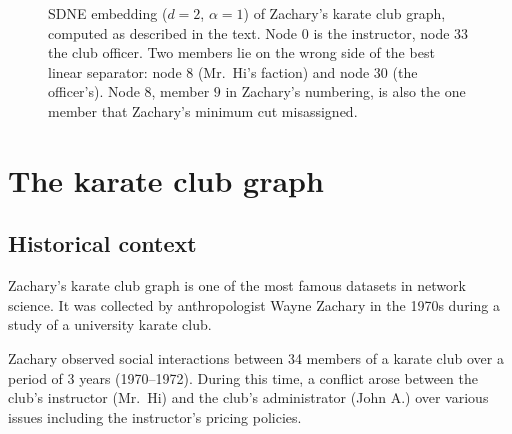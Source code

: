 \begin{notechapter}
\begin{figure}[ht]
\centering
{}
\caption{SDNE embedding ($d = 2$, $\alpha = 1$) of Zachary's karate club graph, computed as described in the text. Node $0$ is the instructor, node $33$ the club officer. Two members lie on the wrong side of the best linear separator: node $8$ (Mr.\ Hi's faction) and node $30$ (the officer's). Node $8$, member $9$ in Zachary's numbering, is also the one member that Zachary's minimum cut misassigned.}
\label{graph-autoencoders:fig:karate}
\end{figure}

\section{The karate club graph}
\label{graph-autoencoders:sec:karate_club}

\subsection{Historical context}

Zachary's karate club graph is one of the most famous datasets in network science. It was collected by anthropologist Wayne Zachary in the 1970s during a study of a university karate club.

\begin{remark}
Zachary observed social interactions between 34 members of a karate club over a period of 3 years (1970--1972). During this time, a conflict arose between the club's instructor (Mr.\ Hi) and the club's administrator (John A.) over various issues including the instructor's pricing policies.


\end{remark}
\end{notechapter}

